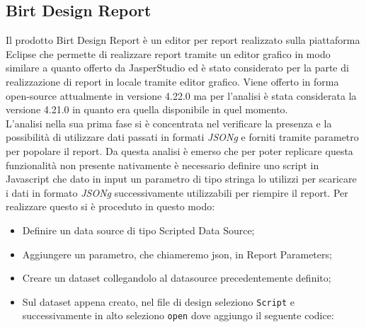     \subsection{Birt Design Report}
    \label{sec:birt-design-report}
    Il prodotto Birt Design Report è un editor per report realizzato sulla piattaforma Eclipse che permette di realizzare report tramite un editor grafico in modo similare a quanto offerto da JasperStudio ed è stato considerato per la parte di realizzazione di report in locale tramite editor grafico.
    Viene offerto in forma open-source attualmente in versione 4.22.0 ma per l'analisi è stata considerata la versione 4.21.0 in quanto era quella disponibile in quel momento.\\
    L'analisi nella sua prima fase si è concentrata nel verificare la presenza e la possibilità di utilizzare dati passati in formati \emph{\gls{JSONg}} e forniti tramite parametro per popolare il report. 
    Da questa analisi è emerso che per poter replicare questa funzionalità non presente nativamente è necessario definire uno script in Javascript che dato in input un parametro di tipo stringa lo utilizzi per scaricare i dati in formato \emph{\gls{JSONg}} successivamente utilizzabili per riempire il report. 
    Per realizzare questo si è proceduto in questo modo:
    \begin{itemize}
        \item Definire un data source di tipo Scripted Data Source;
        \item Aggiungere un parametro, che chiameremo json, in Report Parameters;
        \item Creare un dataset collegandolo al datasource precedentemente definito;
        \item Sul dataset appena creato, nel file di design seleziono \texttt{Script} e successivamente in alto seleziono \texttt{open} dove aggiungo il seguente codice:

    \end{itemize}

